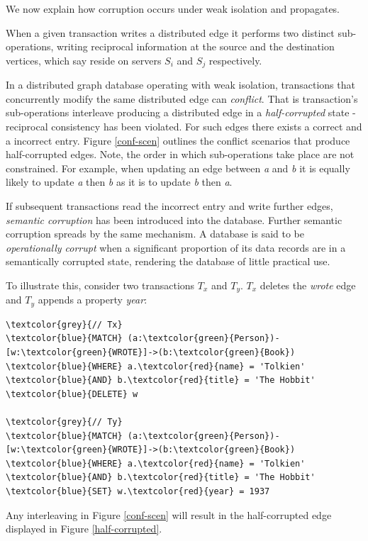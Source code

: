 \documentclass[sigplan,10pt]{acmart}
\begin{document}
We now explain how corruption occurs under weak isolation and propagates.

When a given transaction writes a distributed edge it performs two distinct sub-operations, writing reciprocal information at the source and the destination vertices, which say reside on servers $S_i$ and $S_j$ respectively.

In a distributed graph database operating with weak isolation, transactions that concurrently modify the same distributed edge can \emph{conflict}. That is transaction's sub-operations interleave producing a distributed edge in a \emph{half-corrupted} state - reciprocal consistency has been violated. For such edges there exists a correct and a incorrect entry. Figure \ref{conf-scen} outlines the conflict scenarios that produce half-corrupted edges. Note, the order in which sub-operations take place are not constrained. For example, when updating an edge between \emph{a} and \emph{b} it is equally likely to update \emph{a} then \emph{b} as it is to update \emph{b} then \emph{a}.

If subsequent transactions read the incorrect entry and write further edges, \emph{semantic corruption} has been introduced into the database. Further semantic corruption spreads by the same mechanism. A database is said to be \emph{operationally corrupt} when a significant proportion of its data records are in a semantically corrupted state, rendering the database of little practical use.

To illustrate this, consider two transactions $T_x$ and $T_y$. $T_x$ deletes the \emph{wrote} edge and $T_y$ appends a property \emph{year}:
\begin{Verbatim}[commandchars=\\\{\},fontsize=\small,xleftmargin=.2in]
\textcolor{grey}{// Tx}
\textcolor{blue}{MATCH} (a:\textcolor{green}{Person})-[w:\textcolor{green}{WROTE}]->(b:\textcolor{green}{Book})
\textcolor{blue}{WHERE} a.\textcolor{red}{name} = 'Tolkien' \textcolor{blue}{AND} b.\textcolor{red}{title} = 'The Hobbit'
\textcolor{blue}{DELETE} w

\textcolor{grey}{// Ty}
\textcolor{blue}{MATCH} (a:\textcolor{green}{Person})-[w:\textcolor{green}{WROTE}]->(b:\textcolor{green}{Book})
\textcolor{blue}{WHERE} a.\textcolor{red}{name} = 'Tolkien' \textcolor{blue}{AND} b.\textcolor{red}{title} = 'The Hobbit'
\textcolor{blue}{SET} w.\textcolor{red}{year} = 1937
\end{Verbatim}
Any interleaving in Figure \ref{conf-scen} will result in the half-corrupted edge displayed in Figure \ref{half-corrupted}.
\end{document}
